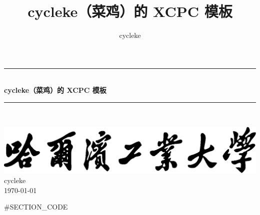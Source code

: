 \documentclass[twoside]{article}
\title{cycleke（菜鸡）的 XCPC 模板}
\author{cycleke}
\newcommand{\HRule}{\rule{\linewidth}{0.5mm}}
\begin{document}
\begin{titlepage}
  \begin{center}
    \HRule{} \\ [1cm]
    \textbf{\Huge{cycleke（菜鸡）的 XCPC 模板}} \\ [0.5cm]
    \HRule{} \\ [4cm]

    \vfill
    \begin{figure}[H]
      \centering
       \quad
    \end{figure}
    \includegraphics[width=.55\linewidth]{school} \\ [2cm]
    \LARGE{cycleke} \\ [1cm]
    \Large{\today}
  \end{center}
  \clearpage
\end{titlepage}

\tableofcontents\clearpage
\pagestyle{fancy}
\lfoot{}
\cfoot{\thepage}\rfoot{}
\setcounter{section}{0}
\setcounter{page}{1}
\clearpage

#SECTION_CODE
\end{document}

